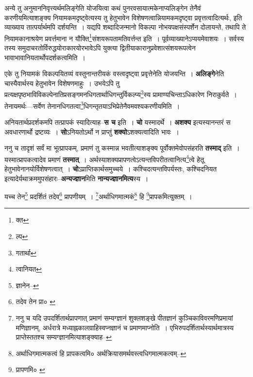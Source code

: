\documentclass[article,12pt,a4paper]{memoir}
\begin{document}
	  \pstart अन्ये तु अनुमाननिवृत्त्यर्थमलिङ्गेति योजयित्वा कथं पुनरवसायात्मकेनाप्यलिङ्गेन तेनैवं करणीयमित्याशङ्क्य नियामकमदृष्ट्वेत्यस्य तु हेतुभावेन विशेषणत्वान्नियामकमदृष्ट्वा प्रवृत्तत्वादित्यर्थः, इति व्याख्याय तात्पर्यार्थमपि दर्शयन्ति । यद्यपि शब्दादिजन्मानो विकल्पा नोभयपक्षसंस्पर्शेन दोलायन्ते, तथापि ते नियामकानाश्रयेण प्रवर्त्तमाना न यौक्ति\footnote{क्त}\-संशयरूपतामतिवर्त्तन्त इति । पूर्वव्याख्यानेऽप्ययमेवाशयः । सर्वस्य तस्य समुदाचरतोर्विरुद्धयोराकारयोरभावेऽपि युक्त्या द्वितीयाकारानुप्रवेशात्संशयरूपत्वेन भावाभावानियतार्थोपदर्शकत्वमिति ।
	\pend
      

	  \pstart एके तु नियामकं विकल्पयितव्यं वस्तुनान्तरीयकं वस्त्वदृष्ट्वा प्रवृत्तेनेति योजयन्ति । \textbf{अलिङ्गे}नेति चास्यैवार्थस्य हेतुभावेन विशेषणमाहुः । उभयेऽपि तु प्रत्यक्षपृष्ठभाविविकल्पेनातिप्रसङ्गमनधिगतार्थाधिगन्तुर्विकल्प्य\footnote{ल्प}\-स्य प्रामाण्यचिन्ताऽधिकारेण निराकुर्वते । तेनायमर्थः—सर्वेण तेनानधिगतत्वा\footnote{गतार्था}\-धिगन्तृतयाऽभिप्रेतेनैवमवश्यकरणीयमिति ।
	\pend
      

	  \pstart अनियतार्थप्रदर्शकमपि तत्प्रापकं स्यादित्याह--\textbf{स च} इति । \textbf{चो} यस्मादर्थे । \textbf{अशक्य} इत्यस्यानन्तरं स अवधारणार्थो द्रष्टव्यः । \textbf{सो}ऽनियतोऽर्थो न प्राप्तुं \textbf{शक्यो}ऽशक्यत्वादिति भावः ।
	\pend
      

	  \pstart ननु च तादृशं सर्वं मा भूत्प्रापकम्, प्रमाणं तु कस्मान्न भवतीत्याशङ्क्य पूर्वोक्तमेवोपसंहरति \textbf{तस्माद्} इति । यस्मात्प्रापकत्वादेव प्रमाणं \textbf{तस्मात्} । अर्थस्याशक्यप्रापणत्वेऽत्यन्तविपरीतत्वानित्य\footnote{त्वानियत}\-त्वे हेतू हेतुभावेनानयोर्विशेषणत्वात् । \textbf{चो}ऽप्राप्तिकार्थसमुच्चये । कश्चिदत्यन्तविपर्यस्तः, कश्चिदनियत इत्यादेर्यथाक्रममुपसंहारः--\textbf{अन्यज्ज्ञान}मिति \textbf{नान्यज्ज्ञानमित्य}स्य ।
	\pend
	  \bigskip
	  \begingroup
	

	  \pstart यच्च तेन\footnote{ज्ञानेन--\cite{dp-msD-n}} प्रदर्शितं तदेव\footnote{तदेव तेन प्रा० \cite{dp-msC} \cite{dp-msD}} प्रापणीयम् । \footnote{ननु च यदि उपदर्शितार्थप्रापणात् प्रमाणं सम्यग्ज्ञानं शुक्लशङ्खे पीतज्ञानं कुञ्चिकाविवरमणिप्रमायां मणिज्ञानम्, अर्धरात्रे मध्याह्नकालग्राहिस्वप्नज्ञानं च प्रमाणमाप्नोति । एभिरुपदर्शितार्थस्यार्थमात्रस्य प्राप्तेस्ततश्च सम्यग्ज्ञानमित्याशङ्क्याह--\cite{dp-msD-n}}\-अर्थाधिगमात्मकं\footnote{अर्थाधिगमात्मकत्वं हि प्रापकत्वमि० \cite{dp-msC} \cite{dp-msD} अर्थक्रियासमर्थवस्त्वधिगमात्मकत्वम्--\cite{dp-msB}} हि \footnote{प्रापणमि० \cite{dp-edN}}\-प्रापकमित्युक्तम् ।
	\pend
      
	  \endgroup
	
\end{document}
